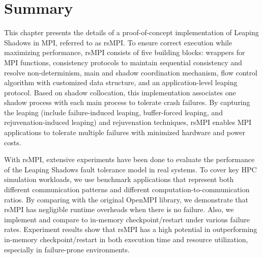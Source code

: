 \section{Summary}
This chapter presents the details of a proof-of-concept implementation of Leaping Shadows in MPI, referred to as rsMPI. To ensure correct execution while maximizing performance, rsMPI consists of five building blocks: wrappers for MPI functions, consistency protocols to maintain sequential consistency and resolve non-determinism, main and shadow coordination mechanism, flow control algorithm with customized data structure, and an application-level leaping protocol. Based on shadow collocation, this implementation associates one shadow process with each main process to tolerate crash failures. By capturing the leaping (include failure-induced leaping, buffer-forced leaping, and rejuvenation-induced leaping) and rejuvenation techniques, rsMPI enables MPI applications to tolerate multiple failures with minimized hardware and power costs. 

With rsMPI, extensive experiments have been done to evaluate the performance of the Leaping Shadows fault tolerance model in real systems. To cover key HPC simulation workloads, we use benchmark applications that represent both different communication patterns and different computation-to-communication ratios. By comparing with the original OpenMPI library, we demonstrate that rsMPI has negligible runtime overheads when there is no failure. Also, we implement and compare to in-memory checkpoint/restart under various failure rates.
Experiment results show that rsMPI has a high potential in outperforming in-memory checkpoint/restart in both execution time and resource utilization, especially in failure-prone environments.




